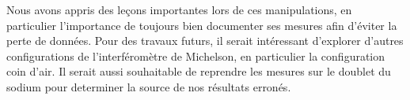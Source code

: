 \documentclass{article}
\begin{document}
Nous avons appris des leçons importantes lors de ces manipulations, en particulier l'importance de toujours bien documenter 
ses mesures afin d'éviter la perte de données. Pour des travaux futurs, il serait intéressant d'explorer d'autres configurations de l'interféromètre de Michelson, 
en particulier la configuration coin d'air. 
Il serait aussi souhaitable de reprendre les mesures sur le doublet du sodium pour determiner la source de nos résultats erronés.
\end{document}

